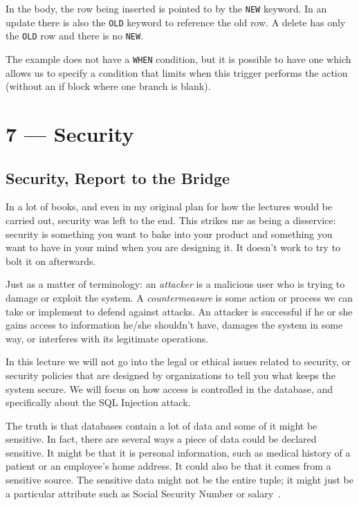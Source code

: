 \documentclass[a4paper]{report}
\begin{document}
In the body, the row being inserted is pointed to by the \texttt{NEW} keyword. In an update there is also the \texttt{OLD} keyword to reference the old row. A delete has only the \texttt{OLD} row and there is no \texttt{NEW}.

The example does not have a \texttt{WHEN} condition, but it is possible to have one which allows us to specify a condition that limits when this trigger performs the action (without an if block where one branch is blank). 










\chapter*{7 --- Security}


\section*{Security, Report to the Bridge}

In a lot of books, and even in my original plan for how the lectures would be carried out, security was left to the end. This strikes me as being a disservice: security is something you want to bake into your product and something you want to have in your mind when you are designing it. It doesn't work to try to bolt it on afterwards. 

Just as a matter of terminology: an \textit{attacker} is a malicious user who is trying to damage or exploit the system. A \textit{countermeasure} is some action or process we can take or implement to defend against attacks. An attacker is successful if he or she gains access to information he/she shouldn't have, damages the system in some way, or interferes with its legitimate operations.

In this lecture we will not go into the legal or ethical issues related to security, or security policies that are designed by organizations to tell you what keeps the system secure. We will focus on how access is controlled in the database, and specifically about the SQL Injection attack. 

The truth is that databases contain a lot of data and some of it might be sensitive. In fact, there are several ways a piece of data could be declared sensitive. It might be that it is personal information, such as medical history of a patient or an employee's home address. It could also be that it comes from a sensitive source. The sensitive data might not be the entire tuple; it might just be a particular attribute  such as Social Security Number or salary~\cite{fds}. 
\end{document}
